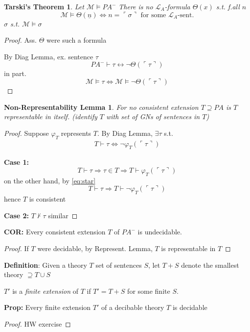 \documentclass[12pt]{article}
\newcommand{\proves}{\vdash}
\newcommand{\gn}[1]{\ulcorner #1 \urcorner}
\newcommand{\defn}{\textbf{Definition}: }
\begin{document}
\newtheorem*{tarski}{Tarski's Theorem}
\begin{tarski}
  Let $\mathcal{M} \models PA^-$
  There is no $\mathcal{L}_A$-formula $\Theta(x)$ s.t. f.all $n$
  \[
  \mathcal{M} \models \Theta(\underline{n}) \Leftrightarrow n = \gn{\sigma}
  \text{ for some $\mathcal{L}_A$-sent.}
  \]
  $\sigma$ s.t. $\mathcal{M} \models \sigma$
\end{tarski}
\begin{proof}
  Ass. $\Theta$ were such a formula

  By Diag Lemma, ex. sentence $\tau$
  \[
  PA^- \proves \tau \leftrightarrow \neg\Theta(\gn{\tau})
  \]
  in part.
  \[
  \mathcal{M} \models \tau \Leftrightarrow \mathcal{M} \models \neg\Theta(\gn{\tau})
  \]
\end{proof}

\newtheorem*{nonrep}{Non-Representability Lemma}
\begin{nonrep}
  For no consistent extension $T\supseteq PA$ is $T$ representable in itself.
  (identify $T$ with set of GNs of sentences in $T$)
\end{nonrep}
\begin{proof}
  Suppose $\varphi_T$ represents $T$.
  By Diag Lemma, $\exists \tau$ s.t. 
  \begin{align}
    \label{eq:star}
  T \proves \tau \Leftrightarrow \neg\varphi_T(\gn{\tau})
  \end{align}

  \textbf{Case 1:}
  \[
  T \proves \tau \Rightarrow \tau \in T \Rightarrow T \proves \varphi_T(\gn{\tau})
  \]
  on the other hand, by \ref{eq:star}
  \[
  T \proves \tau \Rightarrow T \proves \neg \varphi_T(\gn{\tau})
  \]
  hence $T$ is consistent

  \textbf{Case 2:} $T \not\proves \tau$
  similar
\end{proof}

\textbf{COR:} Every consistent extension $T$ of $PA^-$ is undecidable.
\begin{proof}
  If $T$ were decidable, by Represent. Lemma,
  $T$ is representable in $T$
\end{proof}

\defn Given a theory $T$ set of sentences $S$,
        let $T+S$ denote the smallest theory $\supseteq T \cup S$

 $T'$ is a \emph{finite extension} of $T$ if $T' = T+S$
 for some finite $S$.

\textbf{Prop:} Every finite extension $T'$ of a decibable theory $T$ is
decidable
\begin{proof}
  HW exercise
\end{proof}
\end{document}
